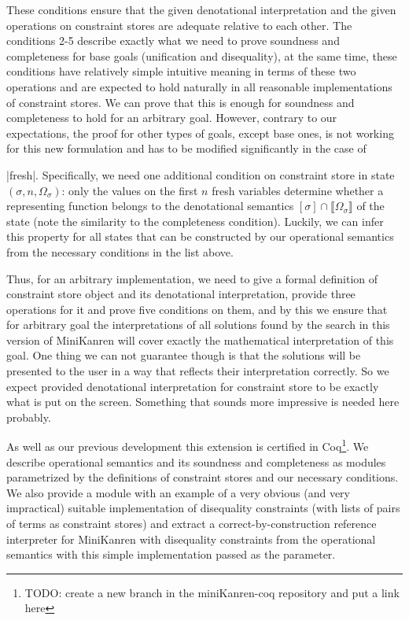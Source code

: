 \documentclass[submission,copyright,creativecommons]{eptcs}
\newcommand*{\SavedLstInline}{}
\DeclareRobustCommand*{\lstinline}{%
  \ifmmode
    \let\SavedBGroup\bgroup
    \def\bgroup{%
      \let\bgroup\SavedBGroup
      \hbox\bgroup
    }%
  \fi
  \SavedLstInline
}
\newcommand{\sembr}[1]{\llbracket{#1}\rrbracket}
\newcommand{\cstore}{\Omega}
\begin{document}
These conditions ensure that the given denotational interpretation and the given operations on constraint stores are adequate relative to each other.
The conditions 2-5 describe exactly what we need to prove soundness and completeness for base goals (unification and disequality), at the same time,
these conditions have relatively simple intuitive meaning in terms of these two operations and are expected to hold naturally in all reasonable
implementations of constraint stores. We can prove that this is enough for soundness and completeness to hold for an arbitrary goal. However,
contrary to our expectations, the proof for other types of goals, except base ones, is not working for this new formulation and has to be modified
significantly in the case of \lstinline|fresh|. Specifically, we need one additional condition on constraint store in state $(\sigma, n, \cstore_\sigma)$:
only the values on the first $n$ fresh variables determine whether a representing function belongs to the denotational semantics $[\sigma] \cap \sembr{\cstore_\sigma}$
of the state (note the similarity to the completeness condition). Luckily, we can infer this property for all states that can be constructed by our operational
semantics from the necessary conditions in the list above.

Thus, for an arbitrary implementation, we need to give a formal definition of constraint store object and its denotational interpretation, provide three
operations for it and prove five conditions on them, and by this we ensure that for arbitrary goal the interpretations of all solutions found by the
search in this version of MiniKanren will cover exactly the mathematical interpretation of this goal. One thing we can not guarantee though is that
the solutions will be presented to the user in a way that reflects their interpretation correctly. So we expect provided denotational interpretation
for constraint store to be exactly what is put on the screen. {\color{red} Something that sounds more impressive is needed here probably.}

As well as our previous development this extension is certified in Coq\footnote{\color{red} TODO: create a new branch in the miniKanren-coq repository
and put a link here}. We describe operational semantics and its soundness and completeness as modules parametrized by the definitions of constraint
stores and our necessary conditions. We also provide a module with an example of a very obvious (and very impractical) suitable implementation of
disequality constraints (with lists of pairs of terms as constraint stores) and extract a correct-by-construction reference interpreter for MiniKanren
with disequality constraints from the operational semantics with this simple implementation passed as the parameter.
\end{document}
